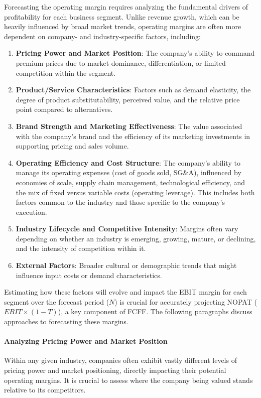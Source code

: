 Forecasting the operating margin requires analyzing the fundamental drivers of profitability for each business segment. Unlike revenue growth, which can be heavily influenced by broad market trends, operating margins are often more dependent on company- and industry-specific factors, including:

\begin{enumerate}
    \item \textbf{Pricing Power and Market Position}: The company's ability to command premium prices due to market dominance, differentiation, or limited competition within the segment.
    \item \textbf{Product/Service Characteristics}: Factors such as demand elasticity, the degree of product substitutability, perceived value, and the relative price point compared to alternatives.
    \item \textbf{Brand Strength and Marketing Effectiveness}: The value associated with the company's brand and the efficiency of its marketing investments in supporting pricing and sales volume.
    \item \textbf{Operating Efficiency and Cost Structure}: The company's ability to manage its operating expenses (cost of goods sold, SG\&A), influenced by economies of scale, supply chain management, technological efficiency, and the mix of fixed versus variable costs (operating leverage). This includes both factors common to the industry and those specific to the company's execution.
    \item \textbf{Industry Lifecycle and Competitive Intensity}: Margins often vary depending on whether an industry is emerging, growing, mature, or declining, and the intensity of competition within it.
    \item \textbf{External Factors}: Broader cultural or demographic trends that might influence input costs or demand characteristics.
\end{enumerate}

Estimating how these factors will evolve and impact the EBIT margin for each segment over the forecast period (\(N\)) is crucial for accurately projecting NOPAT (\(EBIT \times (1-T)\)), a key component of FCFF. The following paragraphs discuss approaches to forecasting these margins.

\paragraph{Analyzing Pricing Power and Market Position}
Within any given industry, companies often exhibit vastly different levels of pricing power and market positioning, directly impacting their potential operating margins. It is crucial to assess where the company being valued stands relative to its competitors.

